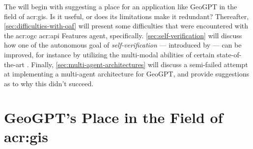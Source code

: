 \begin{comment}

In this section it is important to include a discussion of not just the merits of the work conducted, but also the limitations.
Which choices did you make? Why? What alternatives were there?
{\color{red}\textbf{Note that a key part of the Master's Thesis grading is based on the student's ability to discuss the results in light of the work by others as well as the restrictions and potential of the work itself.}}
While the Results section will report the outcome of each specific experiments, the Discussion should put those results into perspective and look at overall lessons that can be learned from the entire series of experiments.

You should be able to discuss your work in relation to its overall goal and your research questions (i.e., those introduced in Chapter~\ref{cha:introduction}),
but also address issues such as any ethical considerations that the work may entail,
as well as its technical challenges and limitations.

Discussion and evaluation can either be two different chapters, a joint chapter (as here), or part of the concluding chapter
--- or the discussion can be part of that chapter while the evaluation is part of the experimental chapter.

As for most parts of the thesis, it is possible to select various outlines and setups for the discussion; the important thing is that all the relevant parts appear \textit{somewhere\/} in the text.
\end{comment}

The  will begin with suggesting a place for an application like GeoGPT in the field of \acrshort{acr:gis}. Is it useful, or does its limitations make it redundant? Thereafter, \autoref{sec:difficulties-with-oaf} will present some difficulties that were encountered with the \acrshort{acr:ogc} \acrshort{acr:api} Features agent, specifically. \autoref{sec:self-verification} will discuss how one of the autonomous goal of \textit{self-verification} --- introduced by \cite{liAutonomousGISNextgeneration2023} --- can be improved, for instance by utilizing the multi-modal abilities of certain state-of-the-art . Finally, \autoref{sec:multi-agent-architectures} will discuss a semi-failed attempt at implementing a multi-agent architecture for GeoGPT, and provide suggestions as to why this didn't succeed.

\section[GeoGPT's Place in the Field of GIS]{GeoGPT's Place in the Field of \acrshort{acr:gis}}

